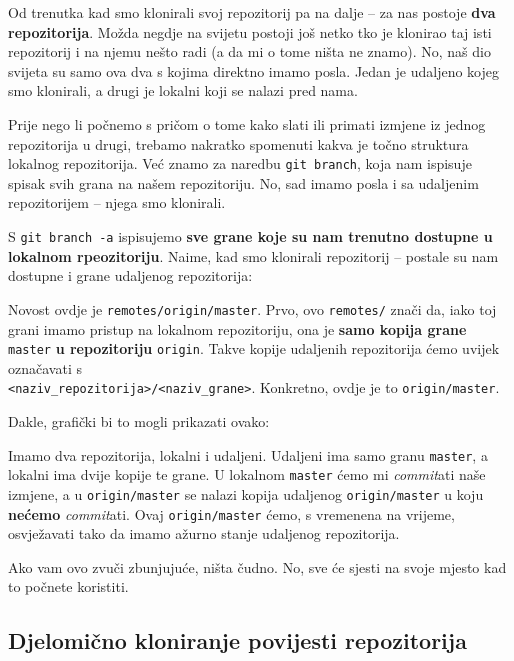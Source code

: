 Od trenutka kad smo klonirali svoj repozitorij pa na dalje -- za nas postoje \textbf{dva repozitorija}.
Možda negdje na svijetu postoji još netko tko je klonirao taj isti repozitorij i na njemu nešto radi (a da mi o tome ništa ne znamo).
No, naš dio svijeta su samo ova dva s kojima direktno imamo posla. 
Jedan je udaljeno kojeg smo klonirali, a drugi je lokalni koji se nalazi pred nama.

Prije nego li počnemo s pričom o tome kako slati ili primati izmjene iz jednog repozitorija u drugi, trebamo nakratko spomenuti kakva je točno struktura lokalnog repozitorija.
Već znamo za naredbu \verb+git branch+, koja nam ispisuje spisak svih grana na našem repozitoriju.
No, sad imamo posla i sa udaljenim repozitorijem -- njega smo klonirali.

S \verb+git branch -a+ ispisujemo \textbf{sve grane koje su nam trenutno dostupne u lokalnom rpeozitoriju}.
Naime, kad smo klonirali repozitorij -- postale su nam dostupne i grane udaljenog repozitorija:



Novost ovdje je \verb+remotes/origin/master+.
Prvo, ovo \verb+remotes/+ znači da, iako toj grani imamo pristup na lokalnom repozitoriju, ona je \textbf{samo kopija grane} \verb+master+ \textbf{u repozitoriju} \verb+origin+.
Takve kopije udaljenih repozitorija ćemo uvijek označavati s \\ \verb+<naziv_repozitorija>/<naziv_grane>+.
Konkretno, ovdje je to \verb+origin/master+.

Dakle, grafički bi to mogli prikazati ovako:



Imamo dva repozitorija, lokalni i udaljeni.
Udaljeni ima samo granu \verb+master+, a lokalni ima dvije kopije te grane. 
U lokalnom \verb+master+ ćemo mi \emph{commit}ati naše izmjene, a u \verb+origin/master+ se nalazi kopija udaljenog \verb+origin/master+ u koju \textbf{nećemo} \emph{commit}ati.
Ovaj \verb+origin/master+ ćemo, s vremenena na vrijeme, osvježavati tako da imamo ažurno stanje udaljenog repozitorija.

Ako vam ovo zvuči zbunjujuće, ništa čudno.
No, sve će sjesti na svoje mjesto kad to počnete koristiti.

\subsection*{Djelomično kloniranje povijesti repozitorija}

